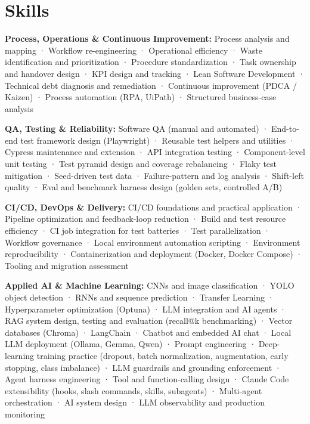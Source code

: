\documentclass[10pt,a4paper]{article}
\newcommand{\cvskill}[2]{\par{\bfseries #1:} #2\par}
\begin{document}

\section{Skills}

\cvskill{Process, Operations \& Continuous Improvement}{Process analysis and mapping · Workflow re-engineering · Operational efficiency · Waste identification and prioritization · Procedure standardization · Task ownership and handover design · KPI design and tracking · Lean Software Development · Technical debt diagnosis and remediation · Continuous improvement (PDCA / Kaizen) · Process automation (RPA, UiPath) · Structured business-case analysis}
\cvskill{QA, Testing \& Reliability}{Software QA (manual and automated) · End-to-end test framework design (Playwright) · Reusable test helpers and utilities · Cypress maintenance and extension · API integration testing · Component-level unit testing · Test pyramid design and coverage rebalancing · Flaky test mitigation · Seed-driven test data · Failure-pattern and log analysis · Shift-left quality · Eval and benchmark harness design (golden sets, controlled A/B)}
\cvskill{CI/CD, DevOps \& Delivery}{CI/CD foundations and practical application · Pipeline optimization and feedback-loop reduction · Build and test resource efficiency · CI job integration for test batteries · Test parallelization · Workflow governance · Local environment automation scripting · Environment reproducibility · Containerization and deployment (Docker, Docker Compose) · Tooling and migration assessment}
\cvskill{Applied AI \& Machine Learning}{CNNs and image classification · YOLO object detection · RNNs and sequence prediction · Transfer Learning · Hyperparameter optimization (Optuna) · LLM integration and AI agents · RAG system design, testing and evaluation (recall@k benchmarking) · Vector databases (Chroma) · LangChain · Chatbot and embedded AI chat · Local LLM deployment (Ollama, Gemma, Qwen) · Prompt engineering · Deep-learning training practice (dropout, batch normalization, augmentation, early stopping, class imbalance) · LLM guardrails and grounding enforcement · Agent harness engineering · Tool and function-calling design · Claude Code extensibility (hooks, slash commands, skills, subagents) · Multi-agent orchestration · AI system design · LLM observability and production monitoring}
\end{document}
